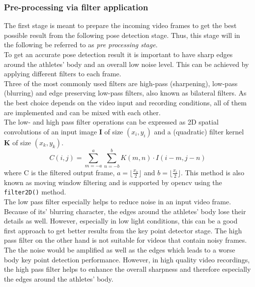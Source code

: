 \subsubsection*{Pre-processing via filter application}\label{subsubsec:4_filter_processing}
The first stage is meant to prepare the incoming video frames to get the best
possible result from the following pose detection stage.
Thus, this stage will in the following be referred to as \textit{pre
processing stage}.\\
To get an accurate pose detection result it is important to have sharp edges
around the athletes' body and an overall low noise level.
This can be achieved by applying different filters to each frame.\\
Three of the most commonly used filters are high-pass (sharpening), low-pass
(blurring) and edge preserving low-pass filters, also known as bilateral
filters.
As the best choice depends on the video input and recording conditions,
all of them are implemented and can be mixed with each other.\\
The low- and high pass filter operations can be expressed as 2D spatial
convolutions of an input image \textbf{I} of size $(x_i,y_i)$ and a (quadratic)
filter kernel \textbf{K} of size $(x_k, y_k)$.
\begin{equation}
    C(i, j) = \sum_{m=-a}^{a} \sum_{n=-b}^{b} K(m, n) \cdot I(i - m, j - n)
\end{equation}   
where C is the filtered output frame, $a = \lfloor \frac{x_k}{2} \rfloor$ and
$b = \lfloor \frac{x_i}{2} \rfloor$.
This method is also known as moving window filtering and is supported by
opencv using the \texttt{filter2D()} method.\\
The low pass filter especially helps to reduce noise in an input video frame.
Because of its' blurring character, the edges around the athletes' body lose
their details as well.
However, especially in low light conditions, this can be a good first approach
to get better results from the key point detector stage.
The high pass filter on the other hand is not suitable for videos that contain
noisy frames.
The the noise would be amplified as well as the edges which leads to
a worse body key point detection performance.
However, in high quality video recordings, the high pass filter helps to
enhance the overall sharpness and therefore especially the edges around the
athletes' body.\\

